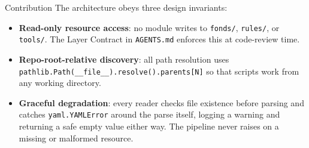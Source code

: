 \documentclass[
  ignorenonframetext,
]{beamer}
\providecommand{\tightlist}{%
  \setlength{\itemsep}{0pt}\setlength{\parskip}{0pt}}
\begin{document}
\begin{frame}{Contribution}
The architecture obeys three design invariants:

\begin{itemize}
\tightlist
\item
  \textbf{Read-only resource access}: no module writes to
  \texttt{fonds/}, \texttt{rules/}, or \texttt{tools/}. The Layer
  Contract in \texttt{AGENTS.md} enforces this at code-review time.
\item
  \textbf{Repo-root-relative discovery}: all path resolution uses
  \texttt{pathlib.Path(\_\_file\_\_).resolve().parents{[}N{]}} so that
  scripts work from any working directory.
\item
  \textbf{Graceful degradation}: every reader checks file existence
  before parsing and catches \texttt{yaml.YAMLError} around the parse
  itself, logging a warning and returning a safe empty value either way.
  The pipeline never raises on a missing or malformed resource.
\end{itemize}
\end{frame}
\end{document}
